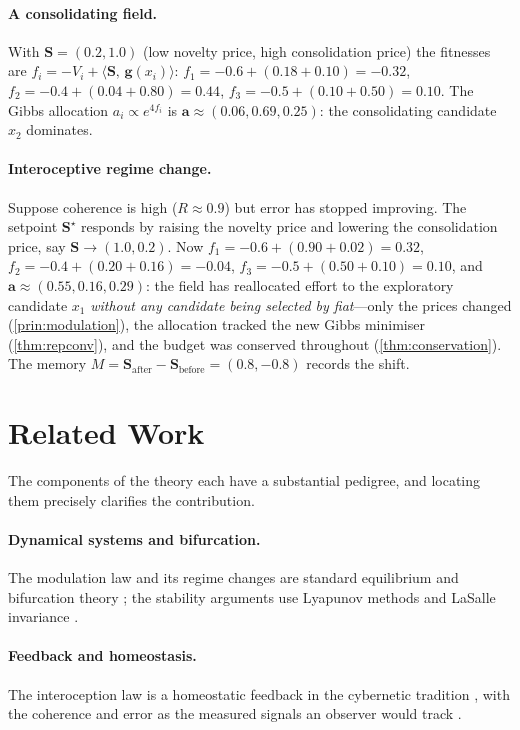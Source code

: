 \documentclass[11pt,a4paper]{article}
\theoremstyle{plain}
\theoremstyle{definition}
\theoremstyle{remark}
\newcommand{\field}{\mathbf{S}}               %
\newcommand{\alloc}{\mathbf{a}}               %
\newcommand{\feat}{\mathbf{g}}                %
\newcommand{\coh}{R}                           %
\newcommand{\inner}[2]{\langle #1,\,#2\rangle}
\newcommand{\setpt}{\field^{\!\star}}
\begin{document}
\paragraph{A consolidating field.} With $\field=(0.2,1.0)$ (low novelty price,
high consolidation price) the fitnesses are
$f_i=-V_i+\inner{\field}{\feat(x_i)}$: $f_1=-0.6+(0.18+0.10)=-0.32$,
$f_2=-0.4+(0.04+0.80)=0.44$, $f_3=-0.5+(0.10+0.50)=0.10$. The Gibbs allocation
$a_i\propto e^{4f_i}$ is $\alloc\approx(0.06,0.69,0.25)$: the consolidating
candidate $x_2$ dominates.

\paragraph{Interoceptive regime change.} Suppose coherence is high
($\coh\approx0.9$) but error has stopped improving. The setpoint $\setpt$
responds by raising the novelty price and lowering the consolidation price, say
$\field\to(1.0,0.2)$. Now $f_1=-0.6+(0.90+0.02)=0.32$,
$f_2=-0.4+(0.20+0.16)=-0.04$, $f_3=-0.5+(0.50+0.10)=0.10$, and
$\alloc\approx(0.55,0.16,0.29)$: the field has reallocated effort to the
exploratory candidate $x_1$ \emph{without any candidate being selected by
fiat}---only the prices changed (\cref{prin:modulation}), the allocation tracked
the new Gibbs minimiser (\cref{thm:repconv}), and the budget was conserved
throughout (\cref{thm:conservation}). The memory $M=\field_{\text{after}}-
\field_{\text{before}}=(0.8,-0.8)$ records the shift.

\section{Related Work}
\label{sec:related}

The components of the theory each have a substantial pedigree, and locating them
precisely clarifies the contribution.

\paragraph{Dynamical systems and bifurcation.} The modulation law and its regime
changes are standard equilibrium and bifurcation theory
\citep{strogatz2015,hirsch2013}; the stability arguments use Lyapunov methods and
LaSalle invariance \citep{khalil2002}.

\paragraph{Feedback and homeostasis.} The interoception law is a homeostatic
feedback in the cybernetic tradition \citep{wiener1948,cannon1929,ashby1960,
astrom2008}, with the coherence and error as the measured signals an observer
would track \citep{kalman1960}.
\end{document}
